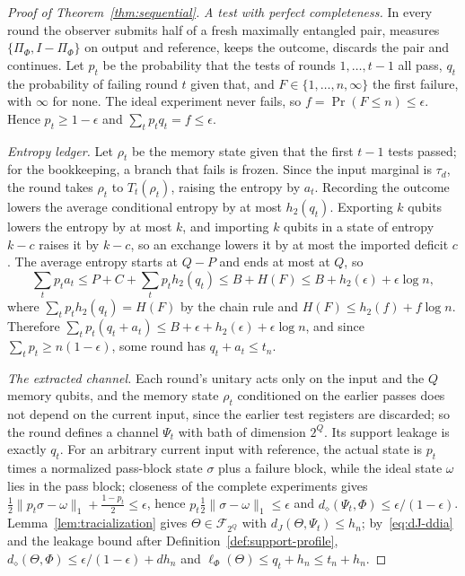\documentclass[11pt,a4paper]{article}
\theoremstyle{plain}
\theoremstyle{definition}
\theoremstyle{remark}
\newcommand{\dJ}{d_J}
\newcommand{\ddia}{d_\diamond}
\begin{document}
\begin{proof}[Proof of Theorem~\ref{thm:sequential}]
\emph{A test with perfect completeness.} In every round the observer submits half of a fresh maximally entangled
pair, measures $\{\Pi_\Phi,I-\Pi_\Phi\}$ on output and reference, keeps the outcome, discards the pair and continues. Let $p_t$ be the
probability that the tests of rounds $1,\dots,t-1$ all pass, $q_t$ the probability of failing round $t$ given that, and $F\in\{1,\dots,n,\infty\}$
the first failure, with $\infty$ for none. The ideal experiment never fails, so $f=\Pr(F\le n)\le\epsilon$. Hence $p_t\ge1-\epsilon$ and
$\sum_tp_tq_t=f\le\epsilon$.

\emph{Entropy ledger.} Let $\rho_t$ be the memory state given that the first $t-1$ tests passed; for the bookkeeping, a branch that fails
is frozen. Since the input marginal is $\tau_d$, the round takes $\rho_t$ to $T_t(\rho_t)$, raising the entropy by $a_t$. Recording the
outcome lowers the average conditional entropy by at most $h_2(q_t)$. Exporting $k$ qubits lowers the entropy by at most $k$, and
importing $k$ qubits in a state of entropy $k-c$ raises it by $k-c$, so an exchange lowers it by at most the imported deficit $c$. The
average entropy starts at $Q-P$ and ends at most at $Q$, so
\[
\sum_tp_ta_t\le P+C+\sum_tp_th_2(q_t)\le B+H(F)\le B+h_2(\epsilon)+\epsilon\log n,
\]
where $\sum_tp_th_2(q_t)=H(F)$ by the chain rule and $H(F)\le h_2(f)+f\log n$. Therefore $\sum_tp_t(q_t+a_t)\le B+\epsilon+h_2(\epsilon)+\epsilon\log n$,
and since $\sum_tp_t\ge n(1-\epsilon)$, some round has $q_t+a_t\le t_n$.

\emph{The extracted channel.} Each round's unitary acts only on the input and the $Q$ memory qubits, and the memory
state $\rho_t$ conditioned on the earlier passes does not depend on the current input, since the earlier test registers are discarded; so
the round defines a channel $\Psi_t$ with bath of dimension $2^Q$. Its support leakage is exactly $q_t$. For an arbitrary current input with
reference, the actual state is $p_t$ times a normalized pass-block state $\sigma$ plus a failure block, while the ideal state $\omega$
lies in the pass block; closeness of the complete experiments gives $\frac12\|p_t\sigma-\omega\|_1+\frac{1-p_t}2\le\epsilon$, hence
$p_t\frac12\|\sigma-\omega\|_1\le\epsilon$ and $\ddia(\Psi_t,\Phi)\le\epsilon/(1-\epsilon)$. Lemma~\ref{lem:tracialization}
gives $\Theta\in\mathcal F_{2^Q}$ with $\dJ(\Theta,\Psi_t)\le h_n$; by~\eqref{eq:dJ-ddia} and the leakage bound after
Definition~\ref{def:support-profile}, $\ddia(\Theta,\Phi)\le\epsilon/(1-\epsilon)+dh_n$ and $\ell_\Phi(\Theta)\le q_t+h_n\le t_n+h_n$.
\end{proof}
\end{document}
